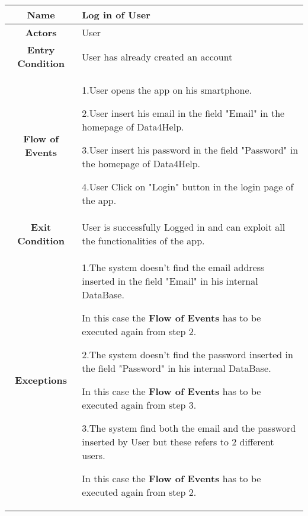       \begin{table}[h!]
        \centering
        \begin{tabularx}{\linewidth}{|c|X|}
          \hline

          \textbf{Name} & Log in of User \\
        	\hline

        	\textbf{Actors} & User \\
        	\hline

        	\textbf{Entry Condition} & User has already created an account\\
        	\hline

        	\textbf{Flow of Events} & 1.User opens the app on his smartphone.

        					2.User insert his email in the field "Email" in the homepage of Data4Help.

        					3.User insert his password in the field "Password" in the homepage of Data4Help.

        					4.User Click on "Login" button in the login page of the app.\\
        	\hline

        	\textbf{Exit Condition} & User is successfully Logged in and can exploit all the functionalities of the app. \\
        	\hline

        	\textbf{Exceptions} & 1.The system doesn't find the email address inserted in the field "Email" in his internal DataBase.

        				In this case the \textbf{Flow of Events} has to be executed again from step 2.

        				2.The system doesn't find the password inserted in the field "Password" in his internal DataBase.

        				 In this case the \textbf{Flow of Events} has to be executed again from step 3.

        				3.The system find both the email and the password inserted by User but these refers to 2 different 						users.

        				In this case the \textbf{Flow of Events} has to be executed again from step 2. \\
         
 \hline

        \end{tabularx}

      \end{table}




